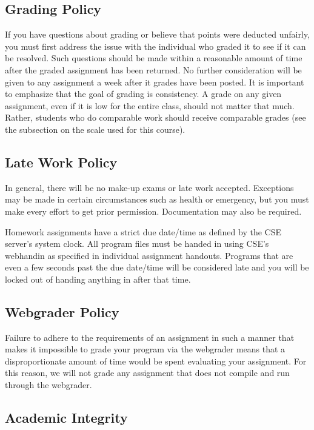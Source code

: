 \documentclass[12pt]{scrartcl}
\begin{document}
\subsection{Grading Policy}

If you have questions about grading or believe that points were 
deducted unfairly, you must first address the issue with the 
individual who graded it to see if it can be resolved.  Such 
questions should be made within a reasonable amount of time 
after the graded assignment has been returned.  No further 
consideration will be given to any assignment a week after 
it grades have been posted.  It is important to emphasize that 
the goal of grading is consistency.  A grade on any given 
assignment, even if it is low for the entire class, should 
not matter that much.  Rather, students who do comparable 
work should receive comparable grades (see the subsection 
on the scale used for this course).

\subsection{Late Work Policy}


In general, there will be no make-up exams or late work
accepted.  Exceptions may be made in certain circumstances 
such as health or emergency, but you must make every effort 
to get prior permission.  Documentation may also be required.

Homework assignments have a strict due date/time as defined by
the CSE server's system clock.  All program files must be handed
in using CSE's webhandin as specified in individual assignment
handouts.  Programs that are even a few seconds past the due 
date/time will be considered late and you will be locked out
of handing anything in after that time.  

\subsection{Webgrader Policy}

Failure to adhere to the requirements of an assignment in such 
a manner that makes it impossible to grade your program via 
the webgrader means that a disproportionate amount of time 
would be spent evaluating your assignment.  For this reason, 
we will not grade any assignment that does not compile and 
run through the webgrader.  

\subsection{Academic Integrity}
\end{document}
